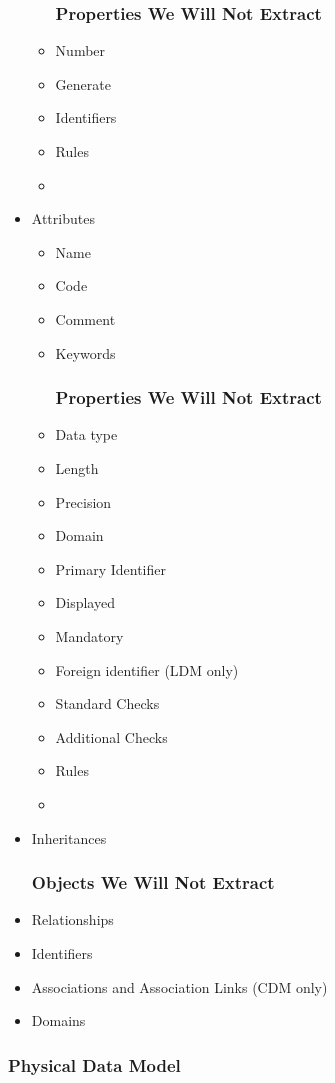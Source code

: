 \begin{itemize}
\begin{itemize}
		\subsubsection{Properties We Will Not Extract}
		\item Number
		\item Generate
		\item Identifiers
		\item Rules
		\item {}
	\end{itemize}
	\item Attributes
	\begin{itemize}
		\item Name 
		\item Code 
		\item Comment
		\item Keywords
		\subsubsection{Properties We Will Not Extract}
		\item Data type 
		\item Length 
		\item Precision
		\item Domain
		\item Primary Identifier
		\item Displayed
		\item Mandatory
		\item Foreign identifier (LDM only)
		\item Standard Checks
		\item Additional Checks
		\item Rules
		\item {}
	\end{itemize}
	\item Inheritances
	\subsubsection{Objects We Will Not Extract}
	\item Relationships
	\item Identifiers
	\item Associations and Association Links (CDM only)
	\item Domains
\end{itemize}

\subsubsection{Physical Data Model}

